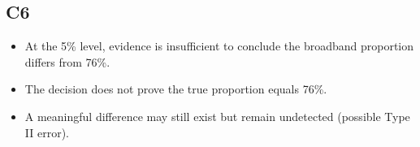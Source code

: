 \begin{ExamProblems}
\subsection*{C6}
\begin{itemize}
    \item At the 5\% level, evidence is insufficient to conclude the broadband proportion differs from 76\%.
    \item The decision does not prove the true proportion equals 76\%.
    \item A meaningful difference may still exist but remain undetected (possible Type II error).
\end{itemize}

\end{ExamProblems}

